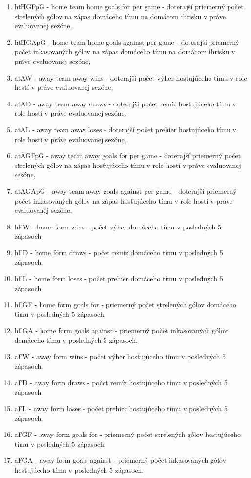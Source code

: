 \begin{enumerate}
 \item htHGFpG - home team home goals for per game - doterajší priemerný počet strelených gólov na zápas domáceho tímu na domácom ihrisku v práve evaluovanej sezóne,
 \item htHGApG - home team home goals against per game - doterajší priemerný počet inkasovaných gólov na zápas domáceho tímu na domácom ihrisku v práve evaluovanej sezóne,
 \item atAW - away team away wins - doterajší počet výher hosťujúceho tímu v role hostí v práve evaluovanej sezóne,
 \item atAD - away team away draws - doterajší počet remíz hosťujúceho tímu v role hostí v práve evaluovanej sezóne,	 
 \item atAL - away team away loses - doterajší počet prehier hosťujúceho tímu v role hostí v práve evaluovanej sezóne,
 \item atAGFpG - away team away goals for per game - doterajší priemerný počet strelených gólov na zápas hosťujúceho tímu v role hostí v práve evaluovanej sezóne,
 \item atAGApG - away team away goals against per game - doterajší priemerný počet inkasovaných gólov na zápas hosťujúceho tímu v role hostí v práve evaluovanej sezóne,
 \item hFW - home form wins - počet výher domáceho tímu v posledných 5 zápasoch,
 \item hFD - home form draws - počet remíz domáceho tímu v posledných 5 zápasoch,
 \item hFL - home form loses - počet prehier domáceho tímu v posledných 5 zápasoch,
 \item hFGF - home form goals for - priemerný počet strelených gólov domáceho tímu v posledných 5 zápasoch,
 \item hFGA - home form goals against - priemerný počet inkasovaných gólov domáceho tímu v posledných 5 zápasoch,
 \item aFW - away form wins - počet výher hosťujúceho tímu v posledných 5 zápasoch, 
 \item aFD - away form draws - počet remíz hosťujúceho tímu v posledných 5 zápasoch,
 \item aFL - away form loses - počet prehier hosťujúceho tímu v posledných 5 zápasoch,
 \item aFGF - away form goals for - priemerný počet strelených gólov hosťujúceho tímu v posledných 5 zápasoch,
 \item aFGA - away form goals against - priemerný počet inkasovaných gólov hosťujúceho tímu v posledných 5 zápasoch,

\end{enumerate}
